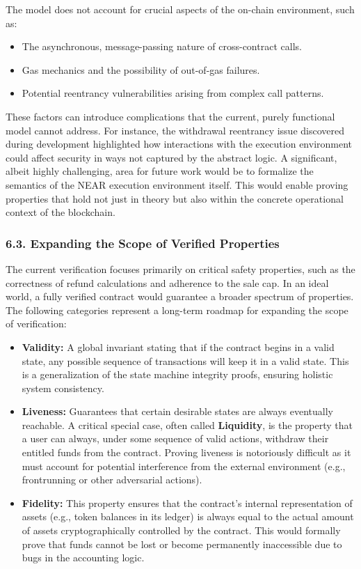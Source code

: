 \documentclass[
  english,
  onecolumn]{article}
\providecommand{\tightlist}{%
  \setlength{\itemsep}{0pt}\setlength{\parskip}{0pt}}
\begin{document}
The model does not account for crucial aspects of the on-chain
environment, such as:

\begin{itemize}
\tightlist
\item
  The asynchronous, message-passing nature of cross-contract calls.
\item
  Gas mechanics and the possibility of out-of-gas failures.
\item
  Potential reentrancy vulnerabilities
   arising from complex call
  patterns.
\end{itemize}

These factors can introduce complications that the current, purely
functional model cannot address. For instance, the withdrawal reentrancy
issue discovered during development highlighted how interactions with
the execution environment could affect security in ways not captured by
the abstract logic. A significant, albeit highly challenging, area for
future work would be to formalize the semantics of the NEAR execution
environment itself. This would enable proving properties that hold not
just in theory but also within the concrete operational context of the
blockchain.

\subsubsection{6.3. Expanding the Scope of Verified
Properties}\label{expanding-the-scope-of-verified-properties}

The current verification focuses primarily on critical safety
properties, such as the correctness of refund calculations and adherence
to the sale cap. In an ideal world, a fully verified contract would
guarantee a broader spectrum of properties. The following categories
represent a long-term roadmap for expanding the scope of verification:

\begin{itemize}
\tightlist
\item
  \textbf{Validity:} A global invariant stating that if the contract
  begins in a valid state, any possible sequence of transactions will
  keep it in a valid state. This is a generalization of the state
  machine integrity proofs, ensuring holistic system consistency.
\item
  \textbf{Liveness:} Guarantees that certain desirable states are always
  eventually reachable. A critical special case, often called
  \textbf{Liquidity}, is the property that a user can always, under some
  sequence of valid actions, withdraw their entitled funds from the
  contract. Proving liveness is notoriously difficult as it must account
  for potential interference from the external environment (e.g.,
  frontrunning or other adversarial actions).
\item
  \textbf{Fidelity:} This property ensures that the contract's internal
  representation of assets (e.g., token balances in its ledger) is
  always equal to the actual amount of assets cryptographically
  controlled by the contract. This would formally prove that funds
  cannot be lost or become permanently inaccessible due to bugs in the
  accounting logic.
\end{itemize}
\end{document}
